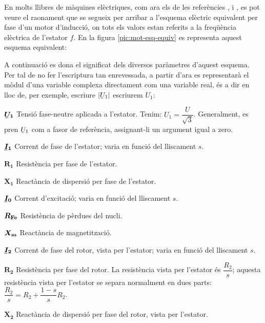 En molts llibres de màquines elèctriques, com ara els de les referències \cite{CHA}, \cite{FIT} i \cite{JFM}, es pot veure el raonament que se segueix per arribar a l'esquema elèctric equivalent per fase d'un motor d'inducció, on tots els valors estan referits a la freqüència elèctrica de l'estator $f$. En la figura \vref{pic:mot-esq-equiv} es representa aquest esquema equivalent:

\begin{center}
    
    \label{pic:mot-esq-equiv}
\end{center}

A continuació es dona el significat dels diversos paràmetres d'aquest esquema. Per tal de no fer l'escriptura tan enrevessada, a partir d'ara es representarà el mòdul d'una variable complexa  directament com una variable real, és a dir en lloc de, per exemple, escriure $|\cmplx{U}_1|$ escriurem $U_1$:

\begin{list}{}
   {\setlength{\labelwidth}{12mm} \setlength{\leftmargin}{12mm} \setlength{\labelsep}{2mm}}
   \item[$\boldsymbol{\cmplx{U}_1}$] Tensió fase-neutre aplicada a l'estator. Tenim: $U_1 = \dfrac{U}{\sqrt{3}}$. Generalment,   es pren $\cmplx{U}_1$ com a fasor de referència, assignant-li un argument igual a zero.
   \item[$\boldsymbol{\cmplx{I}_1}$] Corrent de fase de l'estator; varia en funció del lliscament $s$.
   \item[$\boldsymbol{R_1}$] Resistència per fase de l'estator.
   \item[$\boldsymbol{X_1}$] Reactància de dispersió per fase de l'estator.
   \item[$\boldsymbol{\cmplx{I}_0}$] Corrent d'excitació; varia en funció del lliscament $s$.
   \item[$\boldsymbol{R_\mathrm{Fe}}$] Resistència de pèrdues del nucli.
   \item[$\boldsymbol{X_\mathrm{m}}$] Reactància de magnetització.
   \item[$\boldsymbol{\cmplx{I}_2}$] Corrent de fase del rotor, vista per l'estator; varia en funció del lliscament $s$.
   \item[$\boldsymbol{R_2}$] Resistència per fase del rotor. La resistència vista per l'estator és $\dfrac{R_2}{s}$; aquesta resistència vista per l'estator se separa normalment en dues parts: $\dfrac{R_2}{s} = R_2 + \dfrac{1-s}{s} R_2$.
   \item[$\boldsymbol{X_2}$] Reactància de dispersió per fase del rotor, vista per l'estator.
\end{list}

